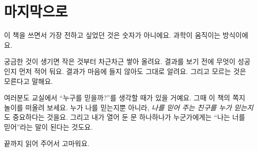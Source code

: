 \section{마지막으로}

이 책을 쓰면서 가장 전하고 싶었던 것은 숫자가 아니에요.
과학이 움직이는 방식이에요.

궁금한 것이 생기면 작은 것부터 차근차근 쌓아 올려요.
결과를 보기 전에 무엇이 성공인지 먼저 적어 둬요.
결과가 마음에 들지 않아도 그대로 알려요.
그리고 모르는 것은 모른다고 말해요.

여러분도 교실에서 “누구를 믿을까?”를 생각할 때가 있을 거예요.
그때 이 책의 쪽지 놀이를 떠올려 보세요.
누가 나를 믿는지뿐 아니라, \emph{나를 믿어 주는 친구를 누가 믿는지}도 중요하다는 것을요.
그리고 내가 열어 둔 문 하나하나가 누군가에게는 “나는 너를 믿어”라는 말이 된다는 것도요.

끝까지 읽어 주어서 고마워요.
